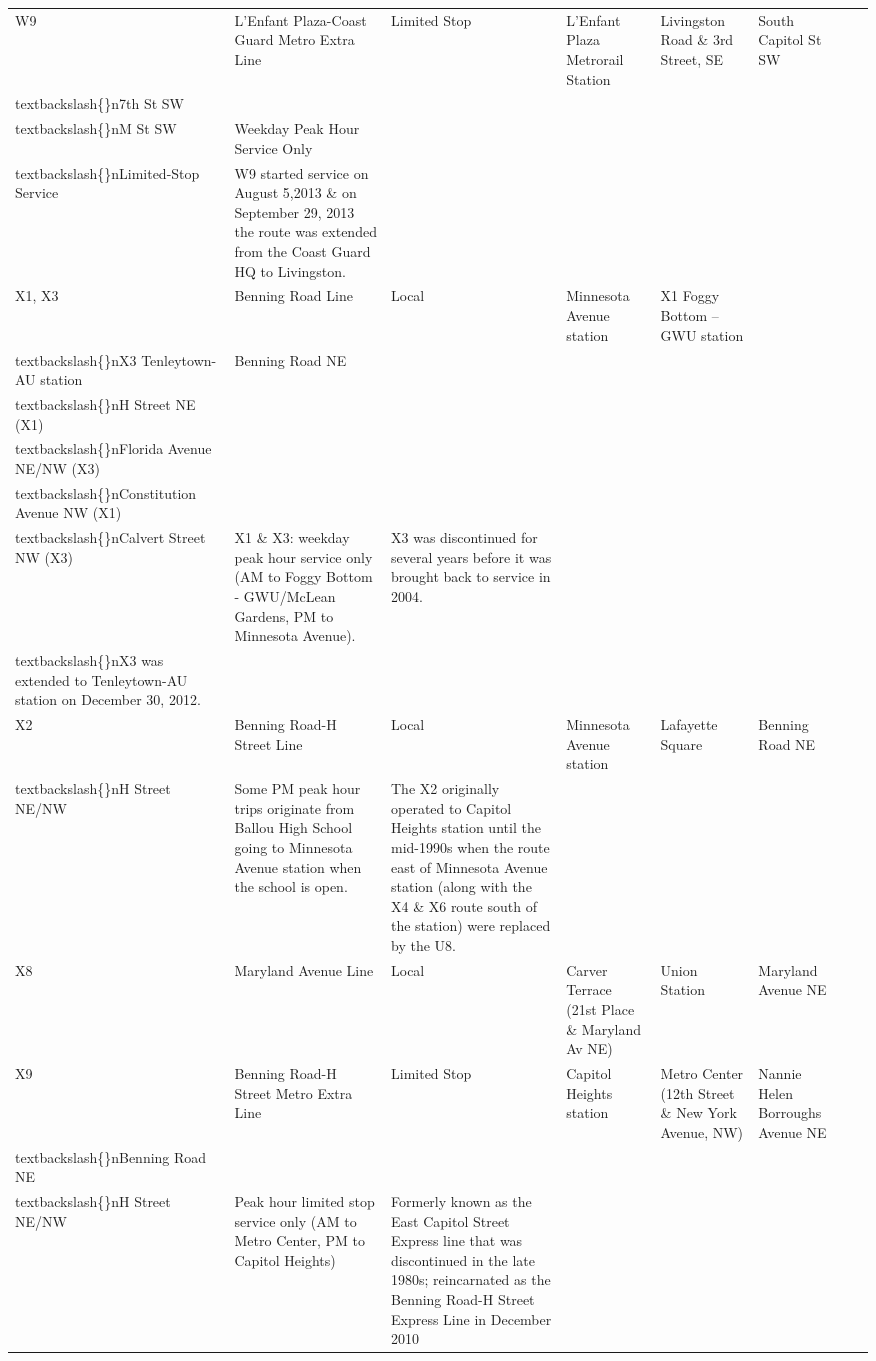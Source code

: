 \documentclass{article}
\begin{document}
\begin{tabular}{llllllll}
W9 & L'Enfant Plaza-Coast Guard Metro Extra Line & Limited Stop & L'Enfant Plaza Metrorail Station & Livingston Road \& 3rd Street, SE & South Capitol St SW\\textbackslash\{\}n7th St SW\\textbackslash\{\}nM St SW & Weekday Peak Hour Service Only\\textbackslash\{\}nLimited-Stop Service & W9 started service on August 5,2013 \& on September 29, 2013 the route was extended from the Coast Guard HQ to Livingston. \\
X1, X3 & Benning Road Line & Local & Minnesota Avenue station & X1 Foggy Bottom – GWU station\\textbackslash\{\}nX3 Tenleytown-AU station & Benning Road NE\\textbackslash\{\}nH Street NE (X1)\\textbackslash\{\}nFlorida Avenue NE/NW (X3)\\textbackslash\{\}nConstitution Avenue NW (X1)\\textbackslash\{\}nCalvert Street NW (X3) & X1 \& X3: weekday peak hour service only (AM to Foggy Bottom - GWU/McLean Gardens, PM to Minnesota Avenue). & X3 was discontinued for several years before it was brought back to service in 2004.\\textbackslash\{\}nX3 was extended to Tenleytown-AU station on December 30, 2012. \\
X2 & Benning Road-H Street Line & Local & Minnesota Avenue station & Lafayette Square & Benning Road NE\\textbackslash\{\}nH Street NE/NW & Some PM peak hour trips originate from Ballou High School going to Minnesota Avenue station when the school is open. & The X2 originally operated to Capitol Heights station until the mid-1990s when the route east of Minnesota Avenue station (along with the X4 \& X6 route south of the station) were replaced by the U8. \\
X8 & Maryland Avenue Line & Local & Carver Terrace (21st Place \& Maryland Av NE) & Union Station & Maryland Avenue NE &  &  \\
X9 & Benning Road-H Street Metro Extra Line & Limited Stop & Capitol Heights station & Metro Center (12th Street \& New York Avenue, NW) & Nannie Helen Borroughs Avenue NE\\textbackslash\{\}nBenning Road NE\\textbackslash\{\}nH Street NE/NW & Peak hour limited stop service only (AM to Metro Center, PM to Capitol Heights) & Formerly known as the East Capitol Street Express line that was discontinued in the late 1980s; reincarnated as the Benning Road-H Street Express Line in December 2010 \\
\bottomrule
\end{tabular}
\end{document}
